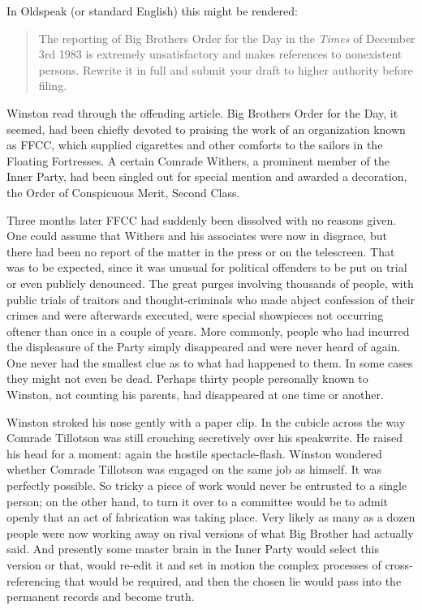 In Oldspeak (or standard English) this might be rendered:

\begin{quotation}
The reporting of Big Brother\textquotesingle s Order for the Day in the
\emph{Times} of December 3rd 1983 is extremely unsatisfactory and makes
references to nonexistent persons. Rewrite it in full and submit your
draft to higher authority before filing.
\end{quotation}

Winston read through the offending article. Big
Brother\textquotesingle s Order for the Day, it seemed, had been chiefly
devoted to praising the work of an organization known as FFCC, which
supplied cigarettes and other comforts to the sailors in the Floating
Fortresses. A certain Comrade Withers, a prominent member of the Inner
Party, had been singled out for special mention and awarded a
decoration, the Order of Conspicuous Merit, Second Class.

Three months later FFCC had suddenly been dissolved with no reasons
given. One could assume that Withers and his associates were now in
disgrace, but there had been no report of the matter in the press or on
the telescreen. That was to be expected, since it was unusual for
political offenders to be put on trial or even publicly denounced. The
great purges involving thousands of people, with public trials of
traitors and thought-criminals who made abject confession of their
crimes and were afterwards executed, were special showpieces not
occurring oftener than once in a couple of years. More commonly, people
who had incurred the displeasure of the Party simply disappeared and
were never heard of again. One never had the smallest clue as to what
had happened to them. In some cases they might not even be dead. Perhaps
thirty people personally known to Winston, not counting his parents, had
disappeared at one time or another.

Winston stroked his nose gently with a paper clip. In the cubicle across
the way Comrade Tillotson was still crouching secretively over his
speakwrite. He raised his head for a moment: again the hostile
spectacle-flash. Winston wondered whether Comrade Tillotson was engaged
on the same job as himself. It was perfectly possible. So tricky a piece
of work would never be entrusted to a single person; on the other hand,
to turn it over to a committee would be to admit openly that an act of
fabrication was taking place. Very likely as many as a dozen people were
now working away on rival versions of what Big Brother had actually
said. And presently some master brain in the Inner Party would select
this version or that, would re-edit it and set in motion the complex
processes of cross-referencing that would be required, and then the
chosen lie would pass into the permanent records and become truth.

